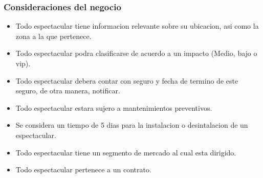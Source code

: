 \subsubsection{Consideraciones del negocio}

\begin{itemize}
	\item Todo espectacular tiene informacion relevante sobre su ubicacion, asi como la zona a la que pertenece.
	\item Todo espectacular podra clasificarse de acuerdo a un impacto (Medio, bajo o vip). 
	\item Todo espectacular debera contar con seguro y fecha de termino de este seguro, de otra manera, notificar.
	\item Todo espectacular estara sujero a mantenimientos preventivos.
	\item Se considera un tiempo de 5 dias para la instalacion o desintalacion de un espectacular. 
	\item Todo espectacular tiene un segmento de mercado al cual esta dirigido.
	\item Todo espectacular pertenece a un contrato.
\end{itemize}